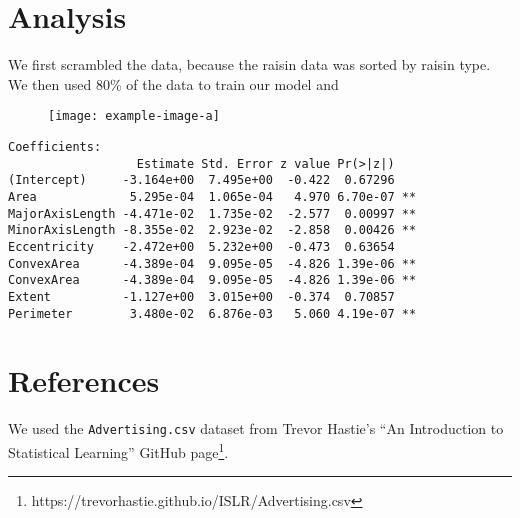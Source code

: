 \documentclass{article}
\begin{document}
\section{Analysis}
We first scrambled the data, because the raisin data was sorted by raisin type. We then used 80\% of the data to train our model and 
\begin{figure}[!h]
	\centering
\texttt{[image: example-image-a]}
\caption{}
\end{figure}
\clearpage
\begin{verbatim}
Coefficients:
                  Estimate Std. Error z value Pr(>|z|)   
(Intercept)     -3.164e+00  7.495e+00  -0.422  0.67296   
Area             5.295e-04  1.065e-04   4.970 6.70e-07 **
MajorAxisLength -4.471e-02  1.735e-02  -2.577  0.00997 **
MinorAxisLength -8.355e-02  2.923e-02  -2.858  0.00426 **
Eccentricity    -2.472e+00  5.232e+00  -0.473  0.63654   
ConvexArea      -4.389e-04  9.095e-05  -4.826 1.39e-06 **
ConvexArea      -4.389e-04  9.095e-05  -4.826 1.39e-06 **
Extent          -1.127e+00  3.015e+00  -0.374  0.70857   
Perimeter        3.480e-02  6.876e-03   5.060 4.19e-07 **
\end{verbatim}



\section{References}
We used the \texttt{Advertising.csv} dataset from Trevor Hastie’s “An Introduction to Statistical Learning”  GitHub page\footnote{https://trevorhastie.github.io/ISLR/Advertising.csv}.
\end{document}
